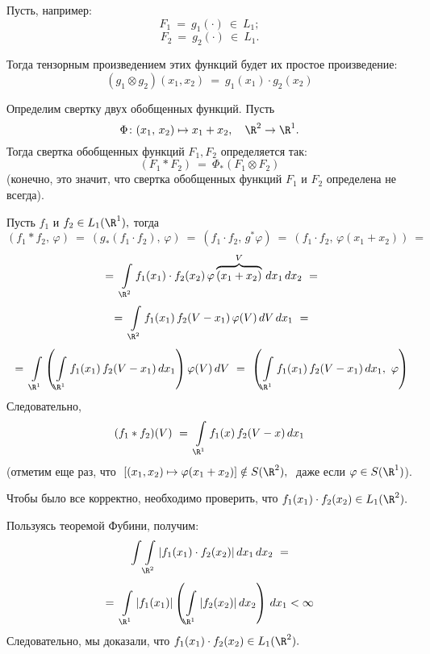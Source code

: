 \documentclass[a4paper]{article}
\newcommand{\ff} {\varphi}
\newcommand{\mro} {\R^1}
\newcommand{\il} {\int\limits_}
\newcommand{\gn}{g_{*}}
\newcommand{\gv}{g^{*}}
\begin{document}
%

\begin{ex}
Пусть, например:\\
$$F_1 \ = \ g_1 (\cdot) \ \in\ L_1;$$
$$F_2 \ = \ g_2 (\cdot) \ \in\ L_1.$$

Тогда тензорным произведением  этих функций будет их простое
произведение:
$$
(g_1 \otimes g_2) (x_1, x_2)\ = \ g_1 (x_1)\cdot g_2(x_2)
$$
\end{ex}

\begin{df}
Определим свертку двух обобщенных функций. Пусть
$$
\Phi\colon (x_1, \, x_2) \mapsto x_1 + x_2, \quad \R^2
\rightarrow \mro.
$$
Тогда свертка обобщенных функций $F_1, F_2$ определяется так:
$$
(F_1 * F_2) \ = \ \Phi_{*} (F_1 \otimes F_2)
$$
(конечно, это значит, что свертка обобщенных функций $F_1$ и $F_2$
определена не всегда).
\end{df}

Пусть $f_1$ и $f_2\in L_1 (\R^1),$ тогда
$$
(f_1 * f_2, \, \ff)\ = \ (\gn(f_1 \cdot f_2), \, \ff)\ = \ (f_1
\cdot f_2, \, \gv\ff)\ = \ (f_1 \cdot f_2, \, \ff(x_1 + x_2))\ =
$$
$$
\ = \ \il{\R^2} f_1 (x_1) \cdot f_2(x_2)\, \ff
\overbrace{(x_1 + x_2)}^{V}\, dx_1 \, dx_2\ =
$$
$$
\ = \ \il{\R^2} f_1(x_1)\, f_2(V-x_1)\, \ff(V)\,dV\,dx_1\
=
$$
$$
\ = \ \il{\mro} \left(\il{\mro} f_1(x_1)\, f_2(V-x_1)\,dx_1
\right)\ff(V)\,dV \ = \ \left( \il{\mro} f_1(x_1)\,
f_2(V-x_1)\,dx_1, \ \ff\right)
$$
Следовательно,
$$
(f_1 * f_2)(V) \ = \ \il{\mro} f_1(x)\, f_2(V-x)\,dx_1
$$
(отметим еще раз, что $\ \left[(x_1, x_2) \mapsto \ff(x_1 +
x_2)\right]\notin S(\R^2),\ $ даже если $\ff \in S
(\mro)$).

Чтобы было все корректно, необходимо проверить, что $f_1 (x_1)
\cdot f_2 (x_2) \in L_1 (\R^2).$

Пользуясь теоремой Фубини, получим:
$$
\int \il{\R^2} |f_1 (x_1)\cdot f_2 (x_2)|\, dx_1\, dx_2 \
=
$$
$$
= \ \il{\mro} |f_1 (x_1)| \left( \il{\mro} |f_2 (x_2)|\, dx_2
\right) \, dx_1 < \infty
$$
Следовательно, мы доказали, что $f_1 (x_1) \cdot f_2 (x_2) \in L_1
(\R^2).$
\end{document}

